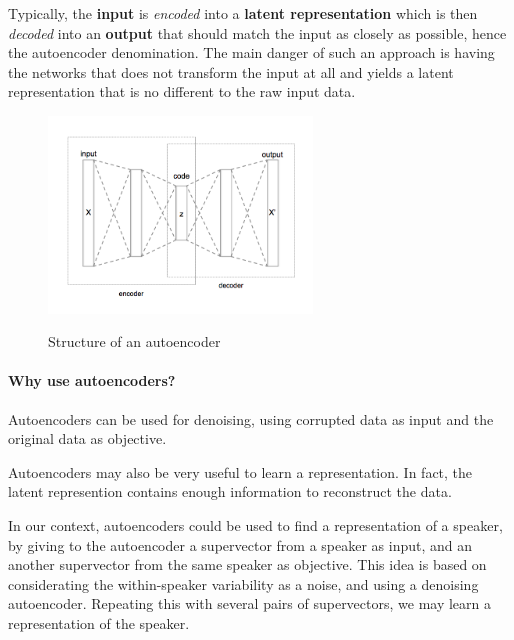 \documentclass[conference]{IEEEtran}
\begin{document}
Typically, the \textbf{input} is \textit{encoded} into a \textbf{latent
  representation} which is then \textit{decoded} into an \textbf{output} that
should match the input as closely as possible, hence the autoencoder
denomination. The main danger of such an approach is having the networks that
does not transform the input at all and yields a latent representation that is
no different to the raw input data. 


\begin{figure}[!h]
    \centering
    \caption{Structure of an autoencoder}
    \includegraphics[width=7cm]{Autoencoder_structure.png}
    \label{autoencoder_structure}
\end{figure}


\paragraph{Why use autoencoders?}

Autoencoders can be used for denoising, using corrupted data as input and the original data as objective.

Autoencoders may also be very useful to learn a representation. In fact, the latent represention contains enough information to reconstruct the data.

In our context, autoencoders could be used to find a representation of a speaker, by giving to the autoencoder a supervector from a speaker as input, and an another supervector from the same speaker as objective. This idea is based on considerating the within-speaker variability as a noise, and using a denoising autoencoder. Repeating this with several pairs of supervectors, we may learn a representation of the speaker. 
\end{document}
